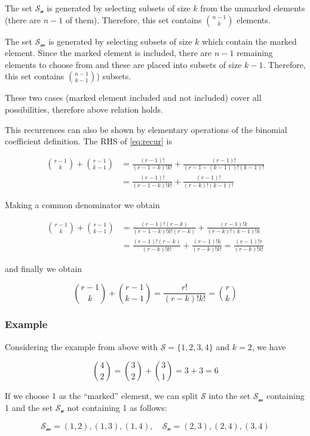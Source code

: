 The set $\mathcal{S_u}$ is generated by selecting subsets of size $k$ from the unmarked elements (there are $n-1$ of them). Therefore, this set contains ${n-1 \choose k}$ elements.

The set $\mathcal{S_m}$ is generated by selecting subsets of size $k$ which contain the marked element. Since the marked element is included, there are $n-1$ remaining elements to choose from and these are placed into subsets of size $k-1$. Therefore, this set contains ${n-1 \choose k-1}$) subsets.

These two cases (marked element included and not included) cover all possibilities, therefore above relation holds.

This recurrences can also be shown by elementary operations of the binomial coefficient definition. The RHS of \eqref{eq:recur} is

\begin{align*}
{r-1 \choose k} + {r-1 \choose k-1} &= \frac{(r-1)!}{(r-1-k)!k!} + \frac{(r-1)!}{(r-1-(k-1))!(k-1)!} \\&= \frac{(r-1)!}{(r-1-k)!k!} + \frac{(r-1)!}{(r-k)!(k-1)!}
\end{align*}

Making a common denominator we obtain

\begin{align*}
{r-1 \choose k} + {r-1 \choose k-1} &= \frac{(r-1)! (r-k)}{(r-1-k)!k!(r-k)} + \frac{(r-1)!k}{(r-k)!(k-1)!k} \\&= \frac{(r-1)! (r-k)}{(r-k)!k!} + \frac{(r-1)!k}{(r-k)!k!} = \frac{(r-1)! r}{(r-k)!k!}
\end{align*}

and finally we obtain

\[
{r-1 \choose k} + {r-1 \choose k-1} = \frac{r!}{(r-k)!k!} = {r \choose k}
\]

\subsubsection{Example}

Considering the example from above with $\mathcal{S} = \{1,2,3,4\}$ and $k=2$, we have

\[{4 \choose 2} = {3 \choose 2} + {3 \choose 1} = 3 + 3 = 6\]

If we choose 1 as the ``marked'' element, we can split $\mathcal{S}$ into the set $\mathcal{S_m}$ containing 1 and the set $\mathcal{S_u}$ not containing 1 as follows:

\[ \mathcal{S_m} = {(1,2), (1,3), (1,4)}, \quad  \mathcal{S_u} = {(2,3), (2,4), (3,4)} \]

